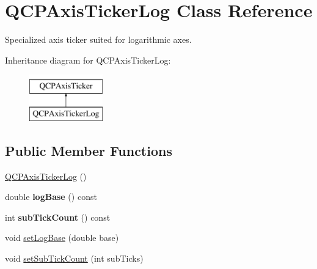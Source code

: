\hypertarget{class_q_c_p_axis_ticker_log}{}\section{Q\+C\+P\+Axis\+Ticker\+Log Class Reference}
\label{class_q_c_p_axis_ticker_log}


Specialized axis ticker suited for logarithmic axes.  


Inheritance diagram for Q\+C\+P\+Axis\+Ticker\+Log\+:\begin{figure}[H]
\begin{center}
\leavevmode
\includegraphics[height=2.000000cm]{class_q_c_p_axis_ticker_log}
\end{center}
\end{figure}
\subsection*{Public Member Functions}
\begin{DoxyCompactItemize}
\item 
\hyperlink{class_q_c_p_axis_ticker_log_af3cb86ea5eef2023c0b96b5260c4cbdf}{Q\+C\+P\+Axis\+Ticker\+Log} ()
\item 
\mbox{\label{class_q_c_p_axis_ticker_log_a841a97f2b6850ff1ef3aa73e89d94775}} 
double {\bfseries log\+Base} () const
\item 
\mbox{\label{class_q_c_p_axis_ticker_log_aebe43661977364fc1fd220fa1ae36a10}} 
int {\bfseries sub\+Tick\+Count} () const
\item 
void \hyperlink{class_q_c_p_axis_ticker_log_ac6e3b4e03baea3816f898869ab9751ef}{set\+Log\+Base} (double base)
\item 
void \hyperlink{class_q_c_p_axis_ticker_log_ad51989c798c0cfd50936d77aac57c56a}{set\+Sub\+Tick\+Count} (int sub\+Ticks)
\end{DoxyCompactItemize}
